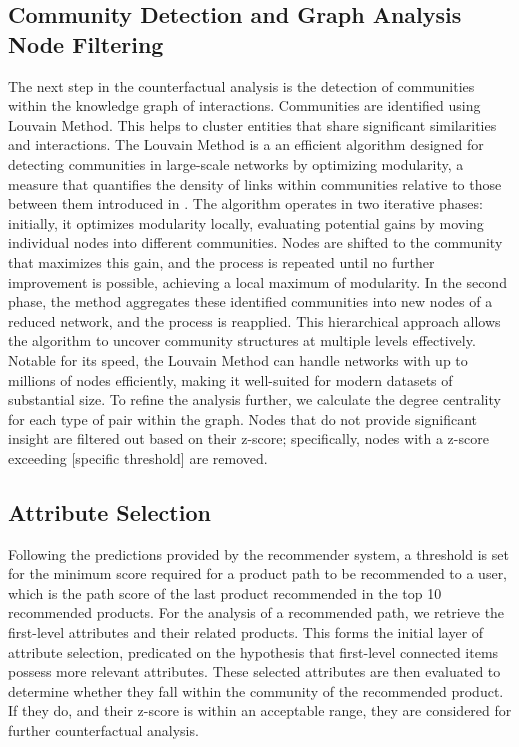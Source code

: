 \subsection{Community Detection and Graph Analysis Node Filtering}
The next step in the counterfactual analysis is the detection of communities within the knowledge graph of interactions.
Communities are identified using Louvain Method. This helps to cluster entities that
share significant similarities and interactions. The Louvain Method is a an
efficient algorithm designed for detecting communities in large-scale networks
by optimizing modularity, a measure that quantifies the density of links within communities
relative to those between them introduced in \parencite{blondel_fast_2008}. The algorithm operates
in two iterative phases: initially, it optimizes modularity locally, evaluating
potential gains by moving individual nodes into different communities. Nodes are
shifted to the community that maximizes this gain, and the process is repeated
until no further improvement is possible, achieving a local maximum of modularity.
In the second phase, the method aggregates these identified communities into new
nodes of a reduced network, and the process is reapplied. This hierarchical approach
allows the algorithm to uncover community structures at multiple levels effectively.
Notable for its speed, the Louvain Method can handle networks with up to millions
of nodes efficiently, making it well-suited for modern datasets of substantial
size. To refine the analysis further, we calculate the degree centrality for
each type of pair within the graph. Nodes that do not provide significant insight
are filtered out based on their z-score; specifically, nodes with a z-score exceeding
	[specific threshold] are removed.

\subsection{Attribute Selection}
Following the predictions provided by the recommender system, a threshold is set
for the minimum score required for a product path to be recommended to a user, which
is the path score of the last product recommended in the top 10 recommended products.
For the analysis of a recommended path, we retrieve the first-level attributes and
their related products. This forms the initial layer of attribute selection, predicated
on the hypothesis that first-level connected items possess more relevant attributes.
These selected attributes are then evaluated to determine whether they fall
within the community of the recommended product. If they do, and their z-score
is within an acceptable range, they are considered for further counterfactual analysis.


